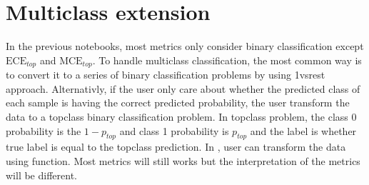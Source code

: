 \documentclass[letterpaper,10pt,english]{sphinxmanual}
\begin{document}
\chapter{Multiclass extension}
\label{\detokenize{notebooks/topclass:Multiclass-extension}}\label{\detokenize{notebooks/topclass::doc}}
\sphinxAtStartPar
In the previous notebooks, most metrics only consider binary classification except \(\text{ECE}_{top}\) and \(\text{MCE}_{top}\). To handle multi\sphinxhyphen{}class classification, the most common way is to convert it to a series of binary classification problems by using 1\sphinxhyphen{}vs\sphinxhyphen{}rest approach. Alternativly, if the user only care about whether the predicted class of each sample is having the correct predicted probability, the user transform the data to a top\sphinxhyphen{}class binary classification problem. In
top\sphinxhyphen{}class problem, the class 0 probability is the \(1-p_{top}\) and class 1 probability is \(p_{top}\) and the label is whether true label is equal to the top\sphinxhyphen{}class prediction. In , user can transform the data using  function. Most metrics will still works but the interpretation of the metrics will be different.
\end{document}
